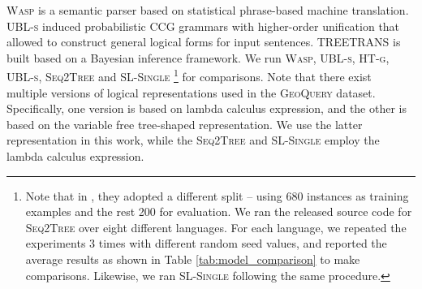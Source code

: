 \documentclass[11pt,a4paper]{article}
\begin{document}
{{{{\textsc{Wasp}} \cite{WongYW:06} is a semantic parser based on statistical phrase-based machine translation.
{{\textsc{UBL-s}}} {\cite{kwiatkowski2010inducing:10}} induced probabilistic CCG grammars with higher-order unification that allowed to construct general logical forms for input sentences.
{T{\small{REE}}T{\small{RANS}}} \cite{Jones:12} is built based on a Bayesian inference framework.
We run {{\textsc{Wasp}}}, {{\textsc{UBL-s}}}, {\textsc{HT-g}}, {\textsc{UBL-s}}, \textsc{Seq2Tree} and \textsc{SL-Single} \footnote{
	Note that in , they adopted a different split -- using 680 instances as training examples and the rest 200 for evaluation.
	We ran the released source code for \textsc{Seq2Tree} \cite{P16-1004} over eight different languages.
	For each language, we repeated the experiments 3 times with different random seed values, and reported the average results as shown in Table \ref{tab:model_comparison} to make comparisons.
	Likewise, we ran \textsc{SL-Single} following the same procedure.} for comparisons.
Note that there exist multiple versions of logical representations used in the \textsc{GeoQuery} dataset.
Specifically, one version is based on lambda calculus expression, and the other is based on the variable free tree-shaped representation.
We use the latter representation in this work, while the {\textsc{Seq2Tree}} and {SL-{\textsc{Single}} employ the lambda calculus expression.
}}}}
\end{document}
